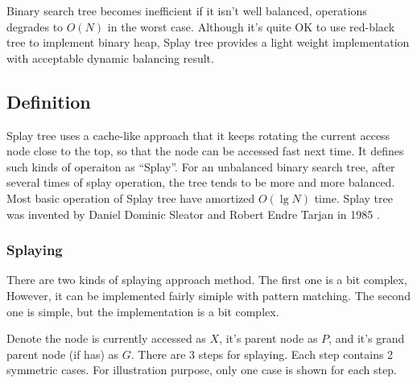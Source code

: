 \documentclass{article}
\begin{document}
Binary search tree becomes inefficient if it isn't well
balanced, operations degrades to $O(N)$ in the worst case.
Although it's quite OK to use red-black tree to implement
binary heap, Splay tree provides a light weight implementation
with acceptable dynamic balancing result.

\subsection{Definition}

Splay tree uses a cache-like approach that it keeps rotating the current
access node close to the top, so that the node can be accessed fast
next time. It defines such kinds of operaiton as ``Splay''. For an 
unbalanced binary search tree, after several times of splay operation, the
tree tends to be more and more balanced. Most basic operation of 
Splay tree have amortized $O(\lg N)$ time. Splay tree was invented
by Daniel Dominic Sleator and Robert Endre Tarjan in 1985\cite{wiki-splay-tree} 
\cite{self-adjusting-trees}.

\subsubsection{Splaying}

There are two kinds of splaying approach method. The first one is
a bit complex, However, it can be implemented fairly simiple with
pattern matching. The second one is simple, but the implementation
is a bit complex.

Denote the node is currently accessed as $X$, it's parent node as $P$,
and it's grand parent node (if has) as $G$. There are 3 steps for 
splaying. Each step contains 2 symmetric cases. For illustration 
purpose, only one case is shown for each step.
\end{document}
